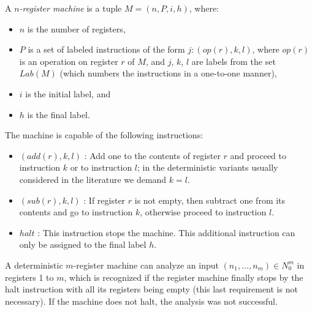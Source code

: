 \begin{definition}
  A {\em $n$-register machine} is a tuple $M = (n,P,i,h)$, where:
  \begin{itemize}
    \item $n$ is the number of registers,
    \item $P$ is a set of labeled instructions of the form $j : (op(r),k,l)$, where $op(r)$ is an operation on register $r$ of $M$, and $j$, $k$, $l$ are labels from the set $Lab(M)$ (which numbers the instructions in a one-to-one manner),
    \item $i$ is the initial label, and
    \item $h$ is the final label.
  \end{itemize}
\end{definition}

The machine is capable of the following instructions:
\begin{itemize}
  \item $(add(r),k,l)$ : Add one to the contents of register $r$ and proceed to instruction $k$ or to instruction $l$; in the deterministic variants usually considered in the literature we demand $k = l$.
  \item $(sub(r),k,l)$ : If register $r$ is not empty, then subtract one from its contents and go to instruction $k$, otherwise proceed to instruction $l$.
  \item $halt$ : This instruction stops the machine. This additional instruction can only be assigned to the final label $h$.
\end{itemize}

A deterministic $m$-register machine can analyze an input $(n_1,\dots,n_m)\in N_0^m$ in registers 1 to $m$, which is recognized if the register machine finally stops by the halt instruction with all its registers being empty (this last requirement is not necessary). If the machine does not halt, the analysis was not successful.